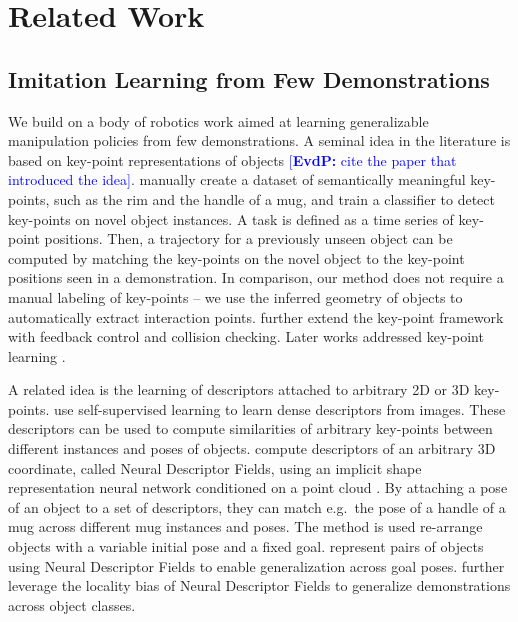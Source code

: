 \documentclass{article}
\newcommand{\evdp}[1]{\textcolor{blue}{[\textbf{EvdP:} #1]}}
\begin{document}
\section{Related Work}

\subsection{Imitation Learning from Few Demonstrations} 

We build on a body of robotics work aimed at learning generalizable manipulation policies from few demonstrations. A seminal idea in the literature is based on key-point representations of objects \evdp{cite the paper that introduced the idea}. \citet{manuelli19kpam} manually create a dataset of semantically meaningful key-points, such as the rim and the handle of a mug, and train a classifier to detect key-points on novel object instances. A task is defined as a time series of key-point positions. Then, a trajectory for a previously unseen object can be computed by matching the key-points on the novel object to the key-point positions seen in a demonstration. In comparison, our method does not require a manual labeling of key-points -- we use the inferred geometry of objects to automatically extract interaction points. \citet{gao21kpam,gao21kpamsc} further extend the key-point framework with feedback control and collision checking. Later works addressed key-point learning \cite{1910,vecerik20s3k,manuelli20keypoints,turpin21gift}.

A related idea is the learning of descriptors attached to arbitrary 2D or 3D key-points. \citet{florence18dense} use self-supervised learning to learn dense descriptors from images. These descriptors can be used to compute similarities of arbitrary key-points between different instances and poses of objects. \citet{chen22neural} compute descriptors of an arbitrary 3D coordinate, called Neural Descriptor Fields, using an implicit shape representation neural network conditioned on a point cloud \cite{mescheder19occupancy}. By attaching a pose of an object to a set of descriptors, they can match e.g.~the pose of a handle of a mug across different mug instances and poses. The method is used re-arrange objects with a variable initial pose and a fixed goal. \citet{simeonov22se,ryu22equivariant} represent pairs of objects using Neural Descriptor Fields to enable generalization across goal poses. \citet{chun23local} further leverage the locality bias of Neural Descriptor Fields to generalize demonstrations across object classes.
\end{document}
